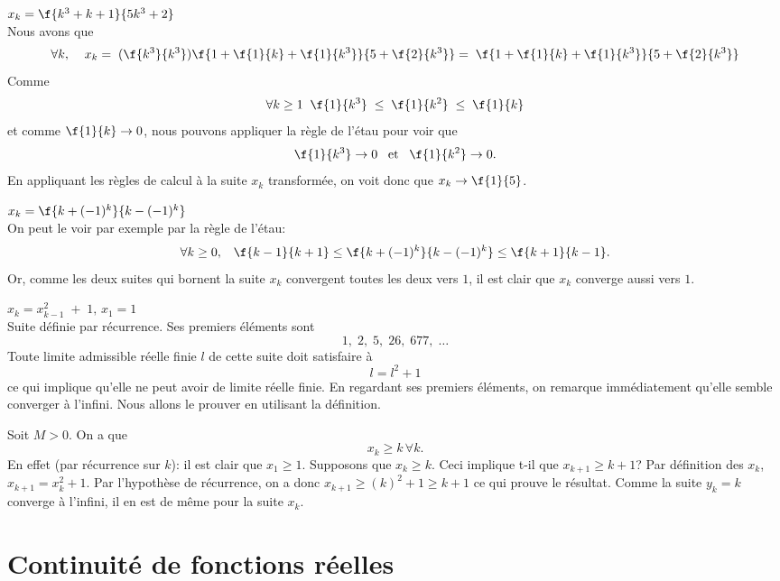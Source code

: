 \vspace{0.5cm}
 $x_k = \f{k^3+k+1}{5k^3+2}$\\

\noindent Nous avons que \[\forall k, \;\;\;\;x_k =\; (\f{k^3}{k^3})\f{1+\f{1}{k} +\f{1}{k^3}}{5+\f{2}{k^3}}=\;\f{1+\f{1}{k} +\f{1}{k^3}}{5+\f{2}{k^3}} \]
Comme \[\forall k \geq 1\;\; \f{1}{k^3} \; \leq \;\f{1}{k^2}\; \leq \; \f{1}{k}\] et comme $\f{1}{k}\rightarrow 0$, nous pouvons appliquer la règle de l'étau pour voir que \[\f{1}{k^3} \rightarrow 0 \; \; \; {\rm et } \;\; \;\f{1}{k^2} \rightarrow 0.\]
En appliquant les règles de calcul à la suite $x_k$ transformée, on voit donc que $x_k \rightarrow  \f{1}{5}$.

\vspace{0.5cm}
 $x_k = \f{k+(-1)^k}{k-(-1)^k}$\\

\noindent On peut le voir par exemple par la règle de l'étau:
\[\forall k \geq 0, \;\;\; \f{k-1}{k+1} \leq \f{k+(-1)^k}{k-(-1)^k} \leq \f{k+1}{k-1}. \]
Or, comme les deux suites qui bornent la suite $x_k$ convergent toutes les deux vers $1$, il est clair que $x_k$ converge aussi vers $1$.


\vspace{0.5cm}
 $x_k = x_{k-1}^2\;+\;1,\, x_1=1$\\

\noindent Suite définie par récurrence. Ses premiers éléments sont \[1, \; 2, \; 5, \;  26, \; 677, \; \ldots\]
Toute  limite admissible réelle finie $l$  de cette suite doit satisfaire à \[l=l^2+1\] ce qui implique qu'elle ne peut avoir de limite réelle finie. En regardant ses premiers éléments, on remarque immédiatement qu'elle semble converger à l'infini. Nous allons le prouver en utilisant la définition.

\noindent Soit $M> 0$. On a que \[x_k \geq k \, \forall k.\] En effet (par récurrence sur $k$): il est clair que $x_1 \geq 1$. Supposons que $x_k \geq k$. Ceci implique t-il que $x_{k+1}\geq k+1$? Par définition des $x_k$, $x_{k+1} = x_k^2+1$. Par l'hypothèse de récurrence, on a donc $x_{k+1}\geq (k)^2 +1\geq k+1$ ce qui prouve le résultat. Comme la suite $y_k=k$ converge à l'infini, il en est de même pour la suite $x_k$.



\section{Continuité de fonctions réelles}


